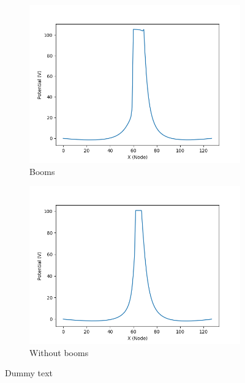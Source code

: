 \begin{center}
    \begin{figure}[H]
      \begin{subfigure}[b]{0.61\textwidth}
      \includegraphics[width=\textwidth]{figures/MMO/minZ/Booms/PhiXBoomsMinZ.png}
      \caption{Booms}
      \label{fig:PhiXBoomsPlusX}
    \end{subfigure}
    \begin{subfigure}[b]{0.61\textwidth}
      \includegraphics[width=\textwidth]{figures/MMO/minZ/noBooms/PhiXnoBoomsMinZ.png}
      \caption{Without booms}
      \label{fig:PhiXnoBoomsMinZ}
    \end{subfigure}
  \label{fig:PhiXDriftMinZ}
  \caption{Dummy text}
  \end{figure}
\end{center}


